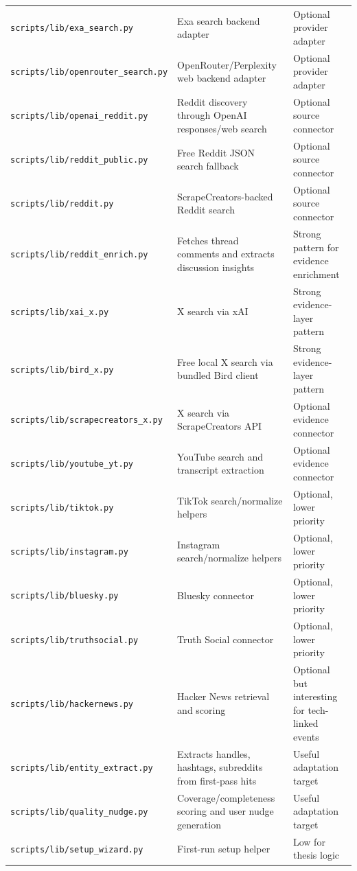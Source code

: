 \documentclass[11pt, letterpaper]{article}
\begin{document}
\begin{longtable}{p{4.0cm}p{4.6cm}p{5.0cm}}
\texttt{scripts/lib/exa\_search.py} & Exa search backend adapter & Optional provider adapter \\
\texttt{scripts/lib/openrouter\_search.py} & OpenRouter/Perplexity web backend adapter & Optional provider adapter \\
\texttt{scripts/lib/openai\_reddit.py} & Reddit discovery through OpenAI responses/web search & Optional source connector \\
\texttt{scripts/lib/reddit\_public.py} & Free Reddit JSON search fallback & Optional source connector \\
\texttt{scripts/lib/reddit.py} & ScrapeCreators-backed Reddit search & Optional source connector \\
\texttt{scripts/lib/reddit\_enrich.py} & Fetches thread comments and extracts discussion insights & Strong pattern for evidence enrichment \\
\texttt{scripts/lib/xai\_x.py} & X search via xAI & Strong evidence-layer pattern \\
\texttt{scripts/lib/bird\_x.py} & Free local X search via bundled Bird client & Strong evidence-layer pattern \\
\texttt{scripts/lib/scrapecreators\_x.py} & X search via ScrapeCreators API & Optional evidence connector \\
\texttt{scripts/lib/youtube\_yt.py} & YouTube search and transcript extraction & Optional evidence connector \\
\texttt{scripts/lib/tiktok.py} & TikTok search/normalize helpers & Optional, lower priority \\
\texttt{scripts/lib/instagram.py} & Instagram search/normalize helpers & Optional, lower priority \\
\texttt{scripts/lib/bluesky.py} & Bluesky connector & Optional, lower priority \\
\texttt{scripts/lib/truthsocial.py} & Truth Social connector & Optional, lower priority \\
\texttt{scripts/lib/hackernews.py} & Hacker News retrieval and scoring & Optional but interesting for tech-linked events \\
\texttt{scripts/lib/entity\_extract.py} & Extracts handles, hashtags, subreddits from first-pass hits & Useful adaptation target \\
\texttt{scripts/lib/quality\_nudge.py} & Coverage/completeness scoring and user nudge generation & Useful adaptation target \\
\texttt{scripts/lib/setup\_wizard.py} & First-run setup helper & Low for thesis logic \\

\end{longtable}
\end{document}
